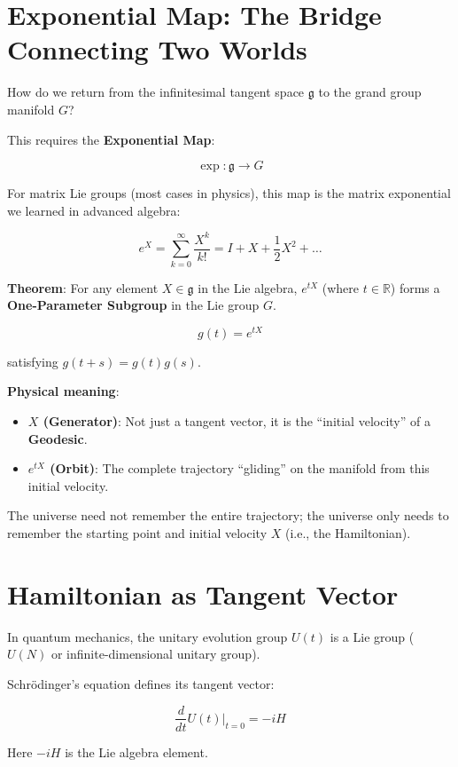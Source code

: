 \section{Exponential Map: The Bridge Connecting Two Worlds}

How do we return from the infinitesimal tangent space $\mathfrak{g}$ to the grand group manifold $G$?

This requires the \textbf{Exponential Map}:

$$\exp: \mathfrak{g} \to G$$

For matrix Lie groups (most cases in physics), this map is the matrix exponential we learned in advanced algebra:

$$e^X = \sum_{k=0}^{\infty} \frac{X^k}{k!} = I + X + \frac{1}{2}X^2 + \dots$$

\textbf{Theorem}: For any element $X \in \mathfrak{g}$ in the Lie algebra, $e^{tX}$ (where $t \in \mathbb{R}$) forms a \textbf{One-Parameter Subgroup} in the Lie group $G$.

$$g(t) = e^{tX}$$

satisfying $g(t+s) = g(t)g(s)$.

\textbf{Physical meaning}:

\begin{itemize}
\item \textbf{$X$ (Generator)}: Not just a tangent vector, it is the ``initial velocity'' of a \textbf{Geodesic}.

\item \textbf{$e^{tX}$ (Orbit)}: The complete trajectory ``gliding'' on the manifold from this initial velocity.
\end{itemize}

The universe need not remember the entire trajectory; the universe only needs to remember the starting point and initial velocity $X$ (i.e., the Hamiltonian).

\section{Hamiltonian as Tangent Vector}

In quantum mechanics, the unitary evolution group $U(t)$ is a Lie group ($U(N)$ or infinite-dimensional unitary group).

Schrödinger's equation defines its tangent vector:

$$\frac{d}{dt} U(t) \Big|_{t=0} = -iH$$

Here $-iH$ is the Lie algebra element.

